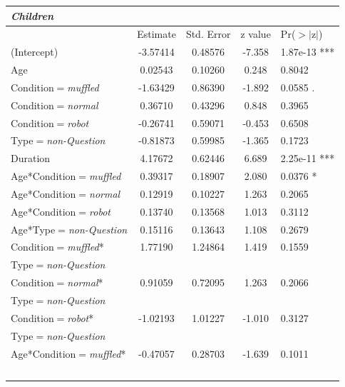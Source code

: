 \documentclass[authoryear, 12pt]{elsarticle}
\begin{document}
\begin{table}[h!]
\begin{center}
  \begin{tabular}{lcccl}
  \textbf{\textit{Children}} &&&& \\
    \hline
                       & Estimate & Std. Error & z value & Pr($>$$|$z$|$)    \\
    \hline
    (Intercept)                & -3.57414  &   0.48576 &  -7.358 & 1.87e-13 ***    \\
    Age                         & 0.02543 &    0.10260  &  0.248   & 0.8042        \\
    Condition$=$\textit{muffled}         &   -1.63429  &   0.86390 &  -1.892   & 0.0585 .      \\
    Condition$=$\textit{normal}            &  0.36710 &    0.43296 &   0.848  &  0.3965        \\
    Condition$=$\textit{robot}            &  -0.26741 &    0.59071 &  -0.453  &  0.6508        \\
    Type$=$\textit{non-Question}                      & -0.81873  &   0.59985 &  -1.365  &  0.1723        \\
    Duration                   &  4.17672  &   0.62446  &  6.689 & 2.25e-11 ***    \\
    Age*Condition$=$\textit{muffled}       &   0.39317 &     0.18907 &   2.080  &  0.0376 *      \\
    Age*Condition$=$\textit{normal}       &   0.12919 &    0.10227  &  1.263  &  0.2065        \\
    Age*Condition$=$\textit{robot}           &   0.13740  &   0.13568   & 1.013  &  0.3112        \\
    Age*Type$=$\textit{non-Question}                &    0.15116   &  0.13643  &  1.108  &  0.2679        \\
    Condition$=$\textit{muffled}*     &  1.77190  &   1.24864  &  1.419 &   0.1559        \\
    Type$=$\textit{non-Question} &&&& \\
    Condition$=$\textit{normal}*     &   0.91059  &   0.72095  &  1.263 &   0.2066        \\
    Type$=$\textit{non-Question} &&&& \\
    Condition$=$\textit{robot}*     &   -1.02193  &   1.01227  & -1.010  &  0.3127        \\
    Type$=$\textit{non-Question} &&&& \\
    Age*Condition$=$\textit{muffled}* &  -0.47057 &    0.28703 &  -1.639 &   0.1011        \\
$$
\end{tabular}
\end{center}
\end{table}
\end{document}
